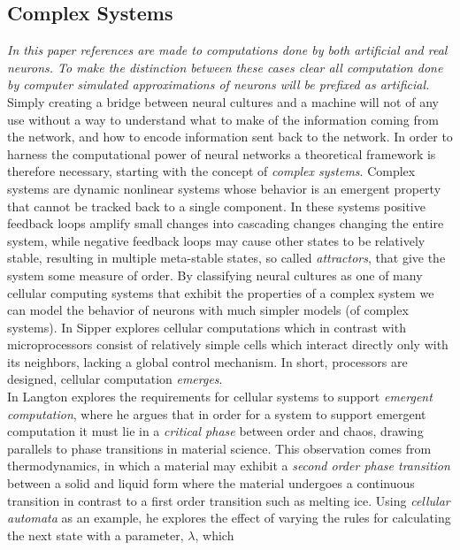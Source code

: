 \subsection{Complex Systems}
\textit{
  In this paper references are made to computations done by both artificial and real
  neurons.
  To make the distinction between these cases clear all computation done by
  computer simulated approximations of neurons will be prefixed as artificial.
}\\
Simply creating a bridge between neural cultures and a machine will not of any
use without a way to understand what to make of the information coming from the
network, and how to encode information sent back to the network.
In order to harness the computational power of neural networks a theoretical
framework is therefore necessary, starting with the concept of \textit{complex
 systems}.
Complex systems are dynamic nonlinear systems whose behavior is an emergent
property that cannot be tracked back to a single component.
In these systems positive feedback loops amplify small changes into cascading
changes changing the entire system, while negative feedback loops may cause
other states to be relatively stable, resulting in multiple meta-stable states,
so called \textit{attractors}, that give the system some measure of order.
By classifying neural cultures as one of many cellular computing systems that
exhibit the properties of a complex system we can model the behavior of neurons
with much simpler models (of complex systems).
In \cite{sipper_emergence_1999} Sipper explores cellular computations which
in contrast with microprocessors consist of relatively simple cells which
interact directly only with its neighbors, lacking a global control mechanism.
In short, processors are designed, cellular computation \textit{emerges}.\\
In \cite{langton_computation_1990} Langton explores the requirements for
cellular systems to support \textit{emergent computation}, where
he argues that in order for a system to support emergent computation it must
lie in a \textit{critical phase} between order and chaos, drawing parallels to
phase transitions in material science.
This observation comes from thermodynamics, in which a material may exhibit a
\textit{second order phase transition} between a solid and liquid form where the
material undergoes a continuous transition in contrast to a first order
transition such as melting ice.
Using \textit{cellular automata} as an example, he explores the effect of varying the
rules for calculating the next state with a parameter, $\lambda$, which

